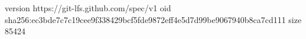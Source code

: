 version https://git-lfs.github.com/spec/v1
oid sha256:ec3bde7c7c19cee9f338429bcf5fde9872eff4e5d7d99be9067940b8ca7cd111
size 85424
